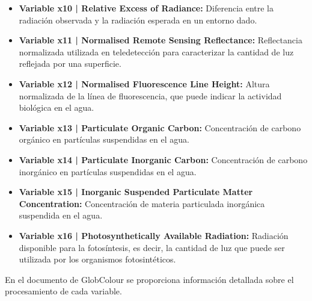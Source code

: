 \begin{itemize}
    \item \textbf{Variable x10 | Relative Excess of Radiance:}
    Diferencia entre la radiación observada y la radiación esperada en un entorno dado.

    \item \textbf{Variable x11 | Normalised Remote Sensing Reflectance:}
    Reflectancia normalizada utilizada en teledetección para caracterizar la cantidad de luz reflejada por una superficie.

    \item \textbf{Variable x12 | Normalised Fluorescence Line Height:}
    Altura normalizada de la línea de fluorescencia, que puede indicar la actividad biológica en el agua.

    \item \textbf{Variable x13 | Particulate Organic Carbon:}
    Concentración de carbono orgánico en partículas suspendidas en el agua.

    \item \textbf{Variable x14 | Particulate Inorganic Carbon:}
    Concentración de carbono inorgánico en partículas suspendidas en el agua.

    \item \textbf{Variable x15 | Inorganic Suspended Particulate Matter Concentration:}
    Concentración de materia particulada inorgánica suspendida en el agua.

    \item \textbf{Variable x16 | Photosynthetically Available Radiation:}
    Radiación disponible para la fotosíntesis, es decir, la cantidad de luz que puede ser utilizada por los organismos fotosintéticos.
\end{itemize}

En el documento de GlobColour \citep{globcolour2020} se proporciona información detallada sobre el procesamiento de cada variable.
